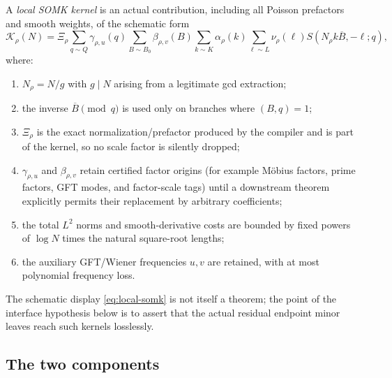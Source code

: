 \documentclass[11pt]{article}
\theoremstyle{definition}
\theoremstyle{remark}
\newcommand{\1}{\mathbf 1}
\newcommand{\Kl}{\mathcal K}
\begin{document}
A \emph{local SOMK kernel} is an actual contribution, including all Poisson prefactors and smooth weights, of the schematic form
\begin{equation}\label{eq:local-somk}
 \Kl_\rho(N)
 =\Xi_\rho
 \sum_{q\sim Q}\gamma_{\rho,u}(q)
 \sum_{B\sim B_0}\beta_{\rho,v}(B)
 \sum_{k\sim K}\alpha_{\rho}(k)
 \sum_{\ell\sim L}\nu_{\rho}(\ell)
 S\!\left(N_\rho k\overline B,-\ell;q\right),
\end{equation}
where:
\begin{enumerate}[label=\textup{(K\arabic*)},leftmargin=2.7em]
\item \(N_\rho=N/g\) with \(g\mid N\) arising from a legitimate gcd extraction;
\item the inverse \(\overline B\pmod q\) is used only on branches where \((B,q)=1\);
\item \(\Xi_\rho\) is the exact normalization/prefactor produced by the compiler and is part of the kernel, so no scale factor is silently dropped;
\item \(\gamma_{\rho,u}\) and \(\beta_{\rho,v}\) retain certified factor origins (for example M\"obius factors, prime factors, GFT modes, and factor-scale tags) until a downstream theorem explicitly permits their replacement by arbitrary coefficients;
\item the total \(L^2\) norms and smooth-derivative costs are bounded by fixed powers of \(\log N\) times the natural square-root lengths;
\item the auxiliary GFT/Wiener frequencies \(u,v\) are retained, with at most polynomial frequency loss.
\end{enumerate}
The schematic display \eqref{eq:local-somk} is not itself a theorem; the point of the interface hypothesis below is to assert that the actual residual endpoint minor leaves reach such kernels losslessly.

\subsection{The two components}
\end{document}
